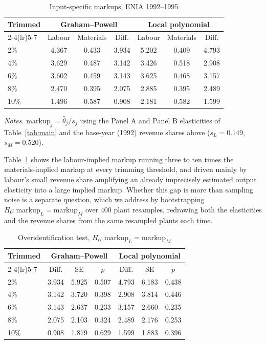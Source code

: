 \documentclass{article}
\begin{document}
\begin{table}[t]
\centering
\caption{Input-specific markups, ENIA 1992--1995}
\label{tab:markup}
\begin{tabular}{lcccccc}
\toprule
Trimmed & \multicolumn{3}{c}{Graham--Powell} & \multicolumn{3}{c}{Local polynomial} \\
\cmidrule(lr){2-4}\cmidrule(lr){5-7}
& Labour & Materials & Diff. & Labour & Materials & Diff. \\
\midrule
2\%  & 4.367 & 0.433 & 3.934 & 5.202 & 0.409 & 4.793 \\
4\%  & 3.629 & 0.487 & 3.142 & 3.426 & 0.518 & 2.908 \\
6\%  & 3.602 & 0.459 & 3.143 & 3.625 & 0.468 & 3.157 \\
8\%  & 2.470 & 0.395 & 2.075 & 2.885 & 0.395 & 2.489 \\
10\% & 1.496 & 0.587 & 0.908 & 2.181 & 0.582 & 1.599 \\
\bottomrule
\end{tabular}

\vspace{0.6em}
\begin{minipage}{0.92\textwidth}
\footnotesize \emph{Notes.} $\text{markup}_j = \hat\theta_j / s_j$ using the Panel A and Panel B elasticities of Table~\ref{tab:main} and the base-year (1992) revenue shares above ($s_L=0.149$, $s_M=0.520$).
\end{minipage}
\end{table}

Table~\ref{tab:markup} shows the labour-implied markup running three to ten times the materials-implied markup at every trimming threshold, and driven mainly by labour's small revenue share amplifying an already imprecisely estimated output elasticity into a large implied markup. Whether this gap is more than sampling noise is a separate question, which we address by bootstrapping $H_0:\text{markup}_L=\text{markup}_M$ over $400$ plant resamples, redrawing both the elasticities and the revenue shares from the same resampled plants each time.

\begin{table}[t]
\centering
\caption{Overidentification test, $H_0: \text{markup}_L=\text{markup}_M$}
\label{tab:overid}
\begin{tabular}{lcccccc}
\toprule
Trimmed & \multicolumn{3}{c}{Graham--Powell} & \multicolumn{3}{c}{Local polynomial} \\
\cmidrule(lr){2-4}\cmidrule(lr){5-7}
& Diff. & SE & $p$ & Diff. & SE & $p$ \\
\midrule
2\%  & 3.934 & 5.925 & 0.507 & 4.793 & 6.183 & 0.438 \\
4\%  & 3.142 & 3.720 & 0.398 & 2.908 & 3.814 & 0.446 \\
6\%  & 3.143 & 2.637 & 0.233 & 3.157 & 2.660 & 0.235 \\
8\%  & 2.075 & 2.103 & 0.324 & 2.489 & 2.176 & 0.253 \\
10\% & 0.908 & 1.879 & 0.629 & 1.599 & 1.883 & 0.396 \\
\bottomrule
\end{tabular}
\end{table}
\end{document}
